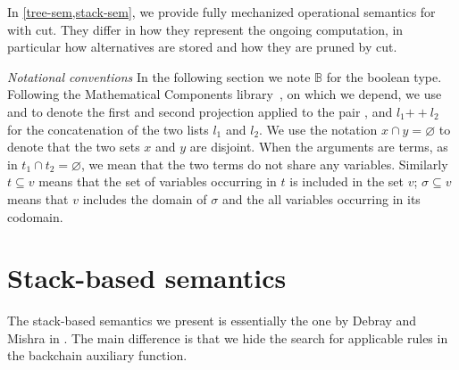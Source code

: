 \documentclass[sigplan,10pt,anonymous,review]{acmart}
\renewcommand{\epsilon}{\varepsilon}
\newcommand{\mappend}{\ensuremath{\mathbin{+\!\!+}}\xspace}
\begin{document}
In \cref{tree-sem,stack-sem}, we provide fully mechanized operational semantics for
\prologP with cut. They differ in how they represent the ongoing computation,
in particular how alternatives are stored and how they are pruned by cut.


\vspace{10pt}
\textit{Notational conventions}
In the following section we note $\mathbb{B}$ for the boolean type. 
Following the Mathematical Components library~\cite{assia_mahboubi_2022_7118596}, on which we depend,
we use  and  to denote the first and second projection
applied to the pair , and $l_1 \mappend l_2$ for the concatenation of the
two lists $l_1$ and $l_2$.
We use the notation $x \cap y =\varnothing$ 
to denote that the two sets $x$ and $y$ are disjoint. When the
arguments are terms, as in $t_1 \cap t_2 = \varnothing$, we mean that the two
terms do not share any variables. Similarly $t \subseteq v$ means that
the set of variables occurring in $t$ is included in the set $v$;
$\sigma \subseteq v$ means that $v$ includes the domain of $\sigma$ and the
all variables occurring in its codomain.




\section{Stack-based semantics}
\label{stack-sem}

The stack-based semantics we present is essentially the one 
by Debray and Mishra in
\cite[Section~4.3]{Debray1988}. The main difference is that we hide the search for
applicable rules in the backchain auxiliary function.
\end{document}
